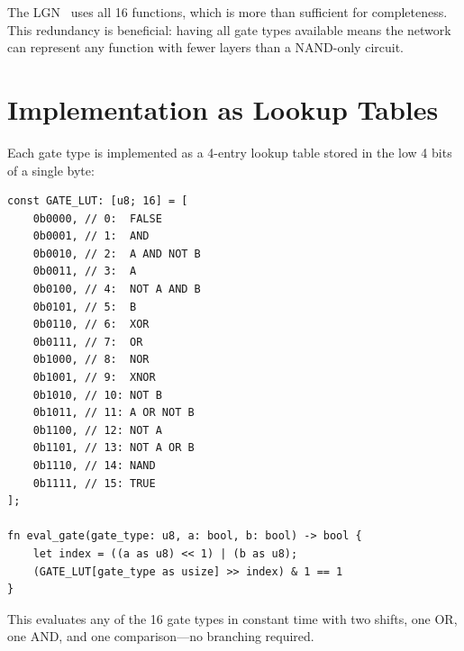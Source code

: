 The LGN~\cite{petersen2022difflogic} uses all 16 functions, which is more than sufficient for
completeness. This redundancy is beneficial: having all gate types
available means the network can represent any function with fewer
layers than a NAND-only circuit.


\section{Implementation as Lookup Tables}
\label{sec:gate-lut}

Each gate type is implemented as a 4-entry lookup table stored in
the low 4 bits of a single byte:

\begin{verbatim}
const GATE_LUT: [u8; 16] = [
    0b0000, // 0:  FALSE
    0b0001, // 1:  AND
    0b0010, // 2:  A AND NOT B
    0b0011, // 3:  A
    0b0100, // 4:  NOT A AND B
    0b0101, // 5:  B
    0b0110, // 6:  XOR
    0b0111, // 7:  OR
    0b1000, // 8:  NOR
    0b1001, // 9:  XNOR
    0b1010, // 10: NOT B
    0b1011, // 11: A OR NOT B
    0b1100, // 12: NOT A
    0b1101, // 13: NOT A OR B
    0b1110, // 14: NAND
    0b1111, // 15: TRUE
];

fn eval_gate(gate_type: u8, a: bool, b: bool) -> bool {
    let index = ((a as u8) << 1) | (b as u8);
    (GATE_LUT[gate_type as usize] >> index) & 1 == 1
}
\end{verbatim}

This evaluates any of the 16 gate types in constant time with two
shifts, one OR, one AND, and one comparison---no branching required.
